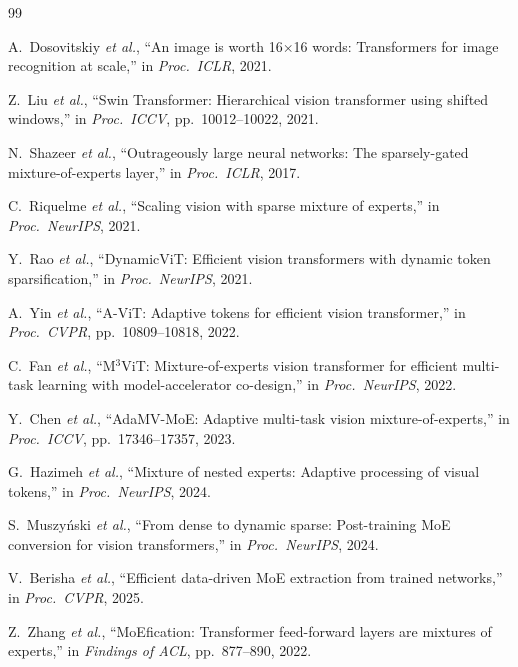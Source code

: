 \documentclass[12pt,a4paper]{article}
\begin{document}
\begin{thebibliography}{99}

A.~Dosovitskiy \emph{et al.}, ``An image is worth 16$\times$16 words: Transformers for image recognition at scale,'' in \emph{Proc.\ ICLR}, 2021.

Z.~Liu \emph{et al.}, ``Swin Transformer: Hierarchical vision transformer using shifted windows,'' in \emph{Proc.\ ICCV}, pp.~10012--10022, 2021.

N.~Shazeer \emph{et al.}, ``Outrageously large neural networks: The sparsely-gated mixture-of-experts layer,'' in \emph{Proc.\ ICLR}, 2017.

C.~Riquelme \emph{et al.}, ``Scaling vision with sparse mixture of experts,'' in \emph{Proc.\ NeurIPS}, 2021.

Y.~Rao \emph{et al.}, ``DynamicViT: Efficient vision transformers with dynamic token sparsification,'' in \emph{Proc.\ NeurIPS}, 2021.

A.~Yin \emph{et al.}, ``A-ViT: Adaptive tokens for efficient vision transformer,'' in \emph{Proc.\ CVPR}, pp.~10809--10818, 2022.

C.~Fan \emph{et al.}, ``M$^3$ViT: Mixture-of-experts vision transformer for efficient multi-task learning with model-accelerator co-design,'' in \emph{Proc.\ NeurIPS}, 2022.

Y.~Chen \emph{et al.}, ``AdaMV-MoE: Adaptive multi-task vision mixture-of-experts,'' in \emph{Proc.\ ICCV}, pp.~17346--17357, 2023.

G.~Hazimeh \emph{et al.}, ``Mixture of nested experts: Adaptive processing of visual tokens,'' in \emph{Proc.\ NeurIPS}, 2024.

S.~Muszy\'{n}ski \emph{et al.}, ``From dense to dynamic sparse: Post-training MoE conversion for vision transformers,'' in \emph{Proc.\ NeurIPS}, 2024.

V.~Berisha \emph{et al.}, ``Efficient data-driven MoE extraction from trained networks,'' in \emph{Proc.\ CVPR}, 2025.

Z.~Zhang \emph{et al.}, ``MoEfication: Transformer feed-forward layers are mixtures of experts,'' in \emph{Findings of ACL}, pp.~877--890, 2022.


\end{thebibliography}
\end{document}
